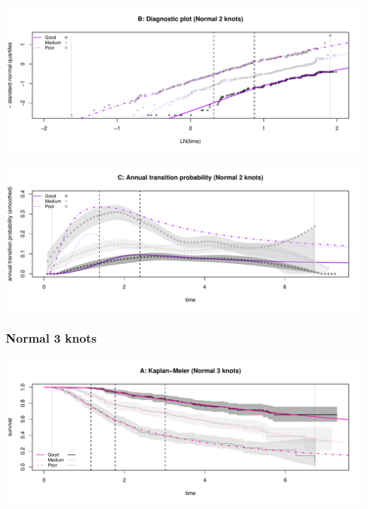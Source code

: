 \documentclass[
]{article}
\begin{document}
\begin{flushleft}\includegraphics[height=0.25\textheight]{BC_OS_output/Images/Figure_spline_models-23} \end{flushleft}

\begin{flushleft}\includegraphics[height=0.25\textheight]{BC_OS_output/Images/Figure_spline_models-24} \end{flushleft}

\clearpage

\subsubsection{Normal 3 knots}\label{normal-3-knots}

\begin{flushleft}\includegraphics[height=0.25\textheight]{BC_OS_output/Images/Figure_spline_models-25} \end{flushleft}
\end{document}
